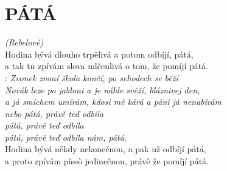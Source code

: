 \section*{\Huge PÁTÁ}
\emph{(Rebelové)}\\

Hodina bývá dlouho trpělivá a potom odbíjí,\hspace{1cm} pátá,\\
a tak tu zpívám slova mlčenlivá o tom, že pomíjí pátá.\\

\textregistered: \emph{Zvonek zvoní škola končí, po schodech se běží\\
Novák leze po jabloni a je náhle svěží, bláznivej den,\\
a já smíchem umírám, kdosi mě kárá a páni já nenabírám\\
nebo pátá,\hspace{0,5cm} právě teď odbila\\
pátá,\hspace{0,5cm} právě teď odbila\\
pátá,\hspace{0,5cm} právě teď odbila nám, pátá.}\\

Hodina bývá někdy nekonečnou, a pak už odbíjí pátá,\\
a proto zpívám píseò jedinečnou, právě že pomíjí pátá.\\

\textregistered

\newpage
